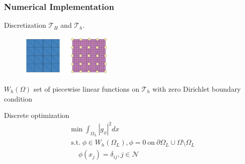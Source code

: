 \documentclass[serif,mathserif, 12pt]{beamer}
\DeclareMathOperator{\ST}{s.t.}
\begin{document}
\begin{frame}
  \frametitle{Numerical Implementation}
  \begin{itemize}
  \item Discretization $\mathcal{T}_H$ and $\mathcal{T}_h$.
    \begin{figure}
      \includegraphics[width=0.4\textwidth]{img/ThandTH}
    \end{figure}
    \pause
  \item $W_h(\Omega)$ set of piecewise linear functions on $\mathcal{T}_h$ with zero Dirichlet boundary
    condition
    \pause
     {\item Discrete optimization
    \begin{equation*}
      \begin{split}
        &\min \int_{\Omega_L} |g_\phi|^2 dx \\
        &\ST \phi \in W_h(\Omega_L), \phi = 0~\text{on}~\partial\Omega_L \cup \Omega\setminus \Omega_L \\
        &~~~~~~\phi(x_j) = \delta_{ij}, j \in \mathcal{N}
      \end{split}
    \end{equation*}
    }
  \end{itemize}
\end{frame}
\end{document}
